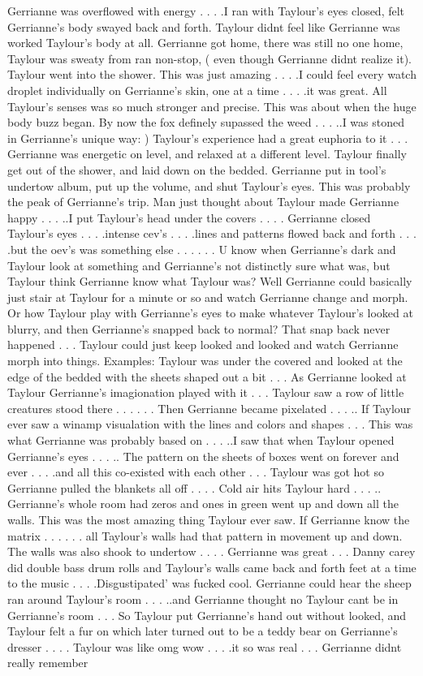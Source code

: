 \documentclass[12pt]{book}
\begin{document}
Gerrianne was overflowed with energy . . .  .I ran with Taylour's eyes closed, felt Gerrianne's body swayed back and forth. Taylour didnt feel like Gerrianne was worked Taylour's body at all. Gerrianne got home, there was still no one home, Taylour was sweaty from ran non-stop, ( even though Gerrianne didnt realize it). Taylour went into the shower. This was just amazing . . .  .I could feel every watch droplet individually on Gerrianne's skin, one at a time . . .  .it was great. All Taylour's senses was so much stronger and precise. This was about when the huge body buzz began. By now the fox definely supassed the weed . . .  ..I was stoned in Gerrianne's unique way: ) Taylour's experience had a great euphoria to it . . .  Gerrianne was energetic on level, and relaxed at a different level. Taylour finally get out of the shower, and laid down on the bedded. Gerrianne put in tool's undertow album, put up the volume, and shut Taylour's eyes. This was probably the peak of Gerrianne's trip. Man just thought about Taylour made Gerrianne happy . . .  ..I put Taylour's head under the covers . . .  . Gerrianne closed Taylour's eyes . . .  .intense cev's . . .  .lines and patterns flowed back and forth . . .  .but the oev's was something else . . .   . . .  U know when Gerrianne's dark and Taylour look at something and Gerrianne's not distinctly sure what was, but Taylour think Gerrianne know what Taylour was? Well Gerrianne could basically just stair at Taylour for a minute or so and watch Gerrianne change and morph. Or how Taylour play with Gerrianne's eyes to make whatever Taylour's looked at blurry, and then Gerrianne's snapped back to normal? That snap back never happened . . .  Taylour could just keep looked and looked and watch Gerrianne morph into things. Examples: Taylour was under the covered and looked at the edge of the bedded with the sheets shaped out a bit . . .  As Gerrianne looked at Taylour Gerrianne's imagionation played with it . . .  Taylour saw a row of little creatures stood there . . .   . . .  Then Gerrianne became pixelated . . . .. If Taylour ever saw a winamp visualation with the lines and colors and shapes . . .  This was what Gerrianne was probably based on . . .  ..I saw that when Taylour opened Gerrianne's eyes . . . .. The pattern on the sheets of boxes went on forever and ever . . .  .and all this co-existed with each other . . .  Taylour was got hot so Gerrianne pulled the blankets all off . . .  . Cold air hits Taylour hard . . . .. Gerrianne's whole room had zeros and ones in green went up and down all the walls. This was the most amazing thing Taylour ever saw. If Gerrianne know the matrix . . .   . . .  all Taylour's walls had that pattern in movement up and down. The walls was also shook to undertow . . .  . Gerrianne was great . . .  Danny carey did double bass drum rolls and Taylour's walls came back and forth feet at a time to the music . . .  .Disgustipated' was fucked cool. Gerrianne could hear the sheep ran around Taylour's room . . .  ..and Gerrianne thought no Taylour cant be in Gerrianne's room . . .  So Taylour put Gerrianne's hand out without looked, and Taylour felt a fur on which later turned out to be a teddy bear on Gerrianne's dresser . . .  . Taylour was like omg wow . . .  .it so was real . . .  Gerrianne didnt really remember 
\end{document}
